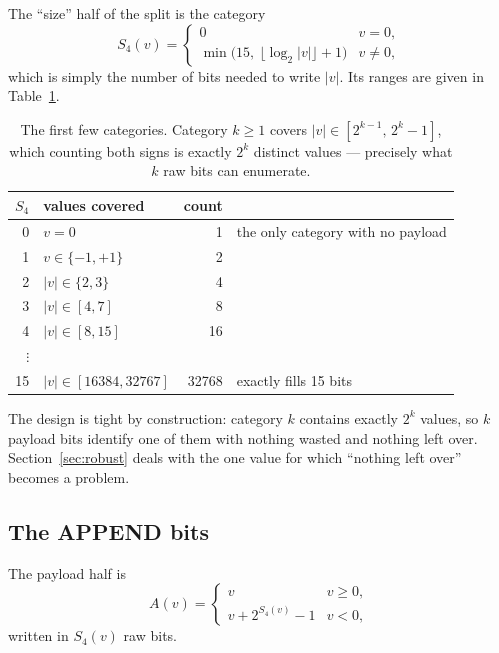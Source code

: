 The ``size'' half of the split is the category
\begin{equation}
\label{eq:s4}
S_4(v) =
\begin{cases}
0 & v = 0,\\[2pt]
\min\bigl(15,\ \lfloor \log_2 |v| \rfloor + 1\bigr) & v \neq 0,
\end{cases}
\end{equation}
which is simply the number of bits needed to write $|v|$. Its ranges are given
in Table~\ref{tab:catranges}.

\begin{table}[h]
\centering
\caption[S4 category ranges]{The first few categories. Category $k \geq 1$
covers $|v| \in [2^{k-1},\, 2^k - 1]$, which counting both signs is exactly
$2^k$ distinct values --- precisely what $k$ raw bits can enumerate.}
\label{tab:catranges}
\small
\begin{tabular}{@{}rlrl@{}}
\toprule
$S_4$ & values covered & count & \\
\midrule
0 & $v = 0$ & 1 & the only category with no payload\\
1 & $v \in \{-1, +1\}$ & 2 & \\
2 & $|v| \in \{2,3\}$ & 4 & \\
3 & $|v| \in [4,7]$ & 8 & \\
4 & $|v| \in [8,15]$ & 16 & \\
$\vdots$ & & & \\
15 & $|v| \in [16384, 32767]$ & \num{32768} & exactly fills 15 bits\\
\bottomrule
\end{tabular}
\end{table}

The design is tight by construction: category $k$ contains exactly $2^k$
values, so $k$ payload bits identify one of them with nothing wasted and
nothing left over. Section~\ref{sec:robust} deals with the one value for which
``nothing left over'' becomes a problem.

\subsection{The APPEND bits}

The payload half is
\begin{equation}
\label{eq:append}
A(v) =
\begin{cases}
v & v \geq 0,\\
v + 2^{S_4(v)} - 1 & v < 0,
\end{cases}
\end{equation}
written in $S_4(v)$ raw bits.

